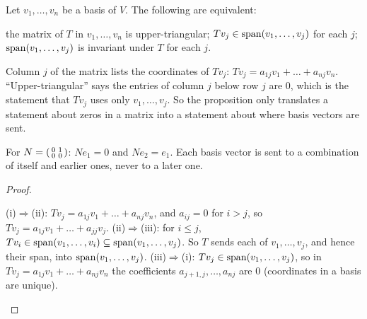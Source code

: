 \documentclass[10pt]{scrartcl}
\begin{document}
\begin{proposition*}\hypertarget{prop-59}{}\label{prop-59}
  Let $v_1,\dots,v_n$ be a basis of $V$. The following are equivalent:
  \begin{enumerate}[(i)]
    \ii the matrix of $T$ in $v_1,\dots,v_n$ is upper-triangular;
    \ii $Tv_j\in\operatorname{span}(v_1,\dots,v_j)$ for each $j$;
    \ii $\operatorname{span}(v_1,\dots,v_j)$ is invariant under $T$ for each $j$.
  \end{enumerate}
\end{proposition*}
\begin{ideabox}
Column $j$ of the matrix lists the coordinates of $Tv_j$: $Tv_j=a_{1j}v_1+\dots+a_{nj}v_n$. ``Upper-triangular'' says the entries of column $j$ below row $j$ are $0$, which is the statement that $Tv_j$ uses only $v_1,\dots,v_j$. So the proposition only translates a statement about zeros in a matrix into a statement about where basis vectors are sent.

For $N=\begin{psmallmatrix}0&1\\0&0\end{psmallmatrix}$: $Ne_1=0$ and $Ne_2=e_1$. Each basis vector is sent to a combination of itself and earlier ones, never to a later one.
\end{ideabox}
\begin{proof}
  \begin{steps}
    \ii (i)$\Rightarrow$(ii): $Tv_j=a_{1j}v_1+\dots+a_{nj}v_n$, and $a_{ij}=0$ for $i>j$, so $Tv_j=a_{1j}v_1+\dots+a_{jj}v_j$.
    \ii (ii)$\Rightarrow$(iii): for $i\le j$, $Tv_i\in\operatorname{span}(v_1,\dots,v_i)\subseteq\operatorname{span}(v_1,\dots,v_j)$. So $T$ sends each of $v_1,\dots,v_j$, and hence their span, into $\operatorname{span}(v_1,\dots,v_j)$.
    \ii (iii)$\Rightarrow$(i): $Tv_j\in\operatorname{span}(v_1,\dots,v_j)$, so in $Tv_j=a_{1j}v_1+\dots+a_{nj}v_n$ the coefficients $a_{j+1,j},\dots,a_{nj}$ are $0$ (coordinates in a basis are unique).
  \end{steps}
\end{proof}
\end{document}
